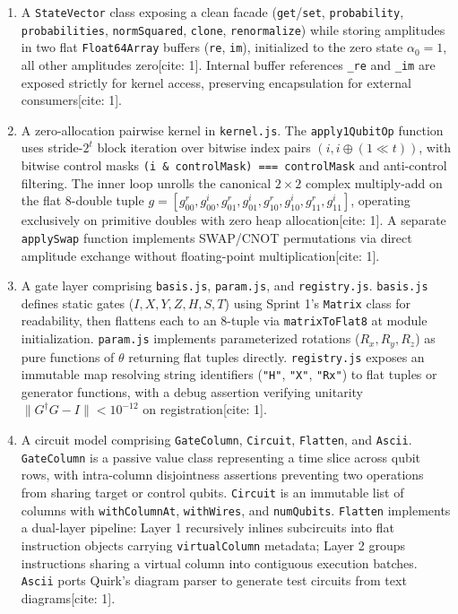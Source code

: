 \documentclass[conference]{IEEEtran}
\begin{document}
\begin{enumerate}
    \item A \texttt{StateVector} class exposing a clean facade (\texttt{get}/\texttt{set}, \texttt{probability}, \texttt{probabilities}, \texttt{normSquared}, \texttt{clone}, \texttt{renormalize}) while storing amplitudes in two flat \texttt{Float64Array} buffers (\texttt{re}, \texttt{im}), initialized to the zero state $\alpha_0 = 1$, all other amplitudes zero[cite: 1]. Internal buffer references \texttt{\_re} and \texttt{\_im} are exposed strictly for kernel access, preserving encapsulation for external consumers[cite: 1].

    \item A zero-allocation pairwise kernel in \texttt{kernel.js}. The \texttt{apply1QubitOp} function uses stride-$2^t$ block iteration over bitwise index pairs $(i, i \oplus (1 \ll t))$, with bitwise control masks \texttt{(i \& controlMask) === controlMask} and anti-control filtering. The inner loop unrolls the canonical $2\times2$ complex multiply-add on the flat 8-double tuple $g = [g_{00}^r, g_{00}^i, g_{01}^r, g_{01}^i, g_{10}^r, g_{10}^i, g_{11}^r, g_{11}^i]$, operating exclusively on primitive doubles with zero heap allocation[cite: 1]. A separate \texttt{applySwap} function implements SWAP/CNOT permutations via direct amplitude exchange without floating-point multiplication[cite: 1].

    \item A gate layer comprising \texttt{basis.js}, \texttt{param.js}, and \texttt{registry.js}. \texttt{basis.js} defines static gates ($I, X, Y, Z, H, S, T$) using Sprint 1's \texttt{Matrix} class for readability, then flattens each to an 8-tuple via \texttt{matrixToFlat8} at module initialization. \texttt{param.js} implements parameterized rotations ($R_x, R_y, R_z$) as pure functions of $\theta$ returning flat tuples directly. \texttt{registry.js} exposes an immutable map resolving string identifiers (\texttt{"H"}, \texttt{"X"}, \texttt{"Rx"}) to flat tuples or generator functions, with a debug assertion verifying unitarity $\|G^\dagger G - I\| < 10^{-12}$ on registration[cite: 1].

    \item A circuit model comprising \texttt{GateColumn}, \texttt{Circuit}, \texttt{Flatten}, and \texttt{Ascii}. \texttt{GateColumn} is a passive value class representing a time slice across qubit rows, with intra-column disjointness assertions preventing two operations from sharing target or control qubits. \texttt{Circuit} is an immutable list of columns with \texttt{withColumnAt}, \texttt{withWires}, and \texttt{numQubits}. \texttt{Flatten} implements a dual-layer pipeline: Layer 1 recursively inlines subcircuits into flat instruction objects carrying \texttt{virtualColumn} metadata; Layer 2 groups instructions sharing a virtual column into contiguous execution batches. \texttt{Ascii} ports Quirk's diagram parser to generate test circuits from text diagrams[cite: 1].


\end{enumerate}
\end{document}

